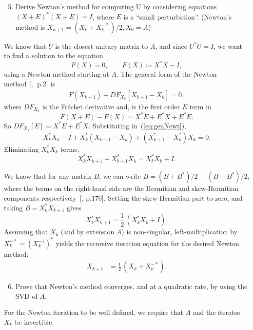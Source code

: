 \documentclass[10pt, A4paper]{article}
\begin{document}
\vspace{0.2cm}
\begin{enumerate}
	\setcounter{enumi}{4}
	\item Derive Newton's method for computing U by considering
	equations $(X+E)^*(X+E) = I$, where $E$ is a ``small perturbation''.
	(Newton's method is $X_{k+1} = (X_k + X_k^{-*})/2, X_0 = A$)
\end{enumerate}

We know that $U$ is the closest unitary matrix to $A$, and since 
$U^*U=I$, we want to find a solution to the equation
$$
	F(X) = 0,\qquad F(X)\coloneqq X^*X - I,
$$
using a Newton method starting at $A$.
The general form of the Newton method~{[\citealp{Kell2003},~p.2]} is
\begin{align}
	F(X_{k+1}) + DF_{X_k} \left[X_{k+1} - X_k\right] = 0,
	\label{eq:genNewt}
\end{align}
where $DF_{X_k}$ is the Fréchet derivative and, is the first order $E$ 
term in
$$
	F(X+E) - F(X) = X^*E + E^*X + E^*E.
$$
So $DF_{X_k}[E] = X^*E + E^*X$.
Substituting in~(\ref{eq:genNewt}),
$$
	X_k^*X_k - I + X_k^* \left( X_{k+1} - X_k \right) + 
		\left( X_{k+1}^* - X_k^* \right)X_k = 0.
$$
Eliminating $X_k^*X_k$ terms,
$$
	X_k^* X_{k+1} + X_{k+1}^*X_k = X_k^* X_k + I.
$$

We know that for any matrix $B$, we can write $B = (B + B^*)/2 \, + 
(B-B^*)/2$, where the terms on the right-hand side are the Hermitian 
and skew-Hermitian components respectively~[\citealp{hojo1985}, p.170].
Setting the skew-Hermitian part to zero, and taking $B = X_k^*X_{k+1}$ 
gives
$$ X_k^*X_{k+1} = \frac{1}{2} \, (X_k^*X_k + I).$$
Assuming that $X_k$ (and by extension $A$) is non-singular, 
left-multiplication by $X_k^{-*} = (X_k^{-1})^*$ yields the recursive 
iteration equation for the desired Newton method:
\begin{align}
	X_{k+1} &= \frac{1}{2} \, (X_k + X_k^{-*}).
	\label{eq:newton}
\end{align}





\vspace{0.2cm}
\begin{enumerate}
	\setcounter{enumi}{5}
	\item Prove that Newton's method converges, and at a quadratic
	rate, by using the SVD of $A$.
\end{enumerate}

For the Newton iteration to be well defined, we require that $A$ and 
the iterates $X_k$ be invertible.
\end{document}

